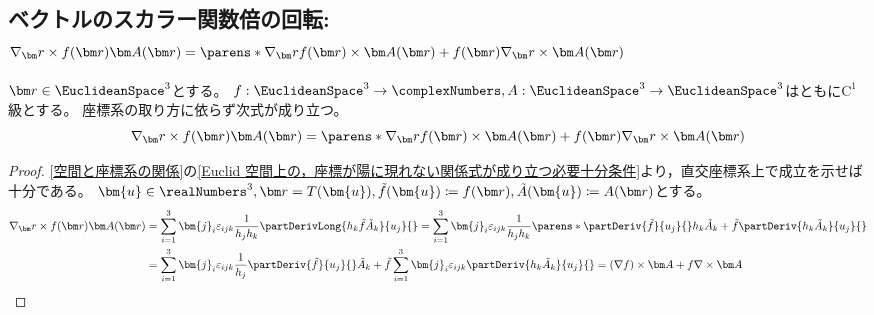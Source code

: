         \subsection{ベクトルのスカラー関数倍の回転\texorpdfstring{: $\nabla_\vr\times f(\vr)\vA(\vr) = \parens*{\nabla_\vr f(\vr)}\times \vA(\vr) + f(\vr)\nabla_\vr\times\vA(\vr)$}{}}
            \label{ベクトルのスカラー関数倍の回転}
            \begin{shadebox}
                $\vr\in\EuclideanSpace^3$とする。
                $f:\EuclideanSpace^3\to\complexNumbers,A:\EuclideanSpace^3\to\EuclideanSpace^3$はともに$\mathrm{C}^1$級とする。
                座標系の取り方に依らず次式が成り立つ。
                \[ \nabla_\vr\times f(\vr)\vA(\vr) = \parens*{\nabla_\vr f(\vr)}\times \vA(\vr) + f(\vr)\nabla_\vr\times\vA(\vr) \]
            \end{shadebox}
            \begin{proof}
                \ref{空間と座標系の関係}の\ref{Euclid 空間上の，座標が陽に現れない関係式が成り立つ必要十分条件}より，直交座標系上で成立を示せば十分である。
                $\bm{u}\in\realNumbers^3,\vr=T(\bm{u}),\tilde{f}(\bm{u})\coloneq f(\vr),\tilde{A}(\bm{u})\coloneq A(\vr)$とする。
                \begin{align*}
                    \nabla_\vr\times f(\vr)\vA(\vr) &= \sum_{i=1}^3 \bm{j}_i\varepsilon_{ijk}\frac{1}{h_j h_k}\partDerivLong{h_k \tilde{f} \tilde{A}_k}{u_j}{} = \sum_{i=1}^3 \bm{j}_i\varepsilon_{ijk}\frac{1}{h_j h_k}\parens*{\partDeriv{\tilde{f}}{u_j}{}h_k \tilde{A}_k + \tilde{f}\partDeriv{h_k \tilde{A}_k}{u_j}{}} \\
                    &= \sum_{i=1}^3 \bm{j}_i\varepsilon_{ijk}\frac{1}{h_j}\partDeriv{\tilde{f}}{u_j}{} \tilde{A}_k + \tilde{f}\sum_{i=1}^3 \bm{j}_i\varepsilon_{ijk}\partDeriv{h_k \tilde{A}_k}{u_j}{} = (\nabla f)\times\vA + f\nabla\times\vA
                \end{align*}
            \end{proof}
